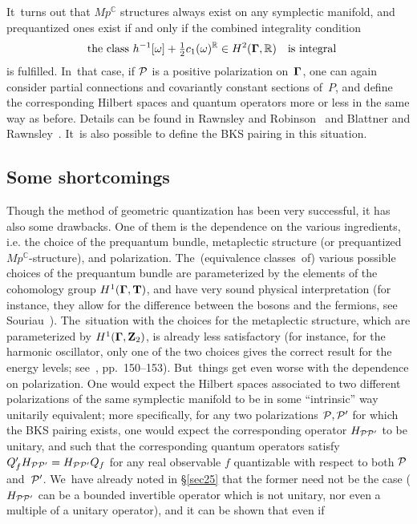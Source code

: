 \documentclass[11pt]{amsart}
\numberwithin{equation}{section}
\theoremstyle{remark}
\newcommand\TT{{\bold T}}
\newcommand\Omg{{\bigam}}   %
\newcommand\PP{{\Cal P}}
\newcommand\ZZ{\bold Z}
\newcommand\GG{{\PP'}}
\newcommand\RR{\mathbb R}
\newcommand{\CC}{\C}
\newcommand{\bigam}{\mbox{\boldmath $\Gamma$}}
\newcommand{\C}{\mathbb C}
\begin{document}
It~turns out that $Mp^\CC$ structures always exist on any symplectic manifold,
and prequantized ones exist if and only if the combined integrality condition
$$ \text{the class }h^{-1} [\omega] + \tfrac12 c_1(\omega)^\RR \in
H^2(\Omg,\RR) \text{ is integral}  $$
is fulfilled. In~that case, if $\PP$ is a positive polarization on~$\Omg$, one
can again consider partial connections and covariantly constant sections
of~$P$, and define the corresponding Hilbert spaces and quantum operators more
or less in the same way as before. Details can be found in Rawnsley and
Robinson~\cite{bib:RawnRob} and Blattner and Rawnsley~\cite{bib:BlattRaCo}.
It~is also possible to define the BKS pairing in this situation.



\subsection{Some shortcomings} \label{sec27}
Though the method of geometric quantization has been very successful, it has
also some drawbacks. One of them is the dependence on the various ingredients,
i.e. the choice of the prequantum bundle, metaplectic structure (or
prequantized $Mp^\CC$-structure), and polarization. The~(equivalence
classes~of) various possible choices of the prequantum bundle are parameterized
by the elements of the cohomology group $H^1(\Omg,\TT)$, and have very sound
physical interpretation (for instance, they allow for the difference between
the bosons and the fermions, see Souriau~\cite{bib:SouSD}). The~situation with
the choices for the metaplectic structure, which are parameterized by
$H^1(\Omg,\ZZ_2)$, is already less satisfactory (for instance, for the harmonic
oscillator, only one of the two choices gives the correct result for the energy
levels; see~\cite{bib:TuyCWI}, pp.~150--153). But~things get even worse
with the dependence on polarization. One would expect the Hilbert spaces
associated to two different polarizations of the same symplectic manifold to be
in some ``intrinsic'' way unitarily equivalent; more specifically, for any two
polarizations $\PP,\GG$ for which the BKS pairing exists, one would expect the
corresponding operator $H_{\PP\GG}$ to be unitary, and such that the
corresponding quantum operators satisfy $Q'_f H_{\PP\GG}= H_{\PP\GG} Q_f$ for
any real observable $f$ quantizable with respect to both $\PP$ and~$\GG$.
We~have already noted in \S\ref{sec25} that the former need not be the case
($H_{\PP\GG}$ can be a bounded invertible operator which is not unitary, nor
even a multiple of a unitary operator), and it can be shown that even if
\end{document}
